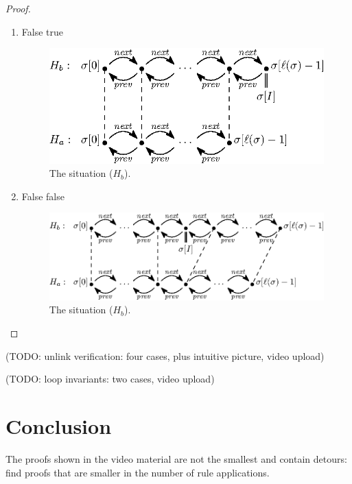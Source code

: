 \documentclass[runningheads]{llncs}
\begin{document}
\begin{proof}
\begin{enumerate}
    \item False true

\begin{figure}
   \centering
   \includegraphics[scale=0.425]{figures/linkedlist-unlink-last.eps}
   \caption{The situation ($H_b$).}
   \vspace*{-12pt}
   \label{fig:unlink-last}
\end{figure}

    \item False false
    
\begin{figure}
   \centering
   \includegraphics[scale=0.425]{figures/linkedlist-unlink-middle.eps}
   \caption{The situation ($H_b$).}
   \vspace*{-12pt}
   \label{fig:unlink-middle}
\end{figure}
    
\end{enumerate}
\end{proof}

(TODO: unlink verification: four cases, plus intuitive picture, video upload)

(TODO: loop invariants: two cases, video upload)

\section{Conclusion}\label{sec:conclusion}

\begin{exercise}
The proofs shown in the video material are not the smallest and contain detours: find proofs that are smaller in the number of rule applications.
\end{exercise}
\end{document}
